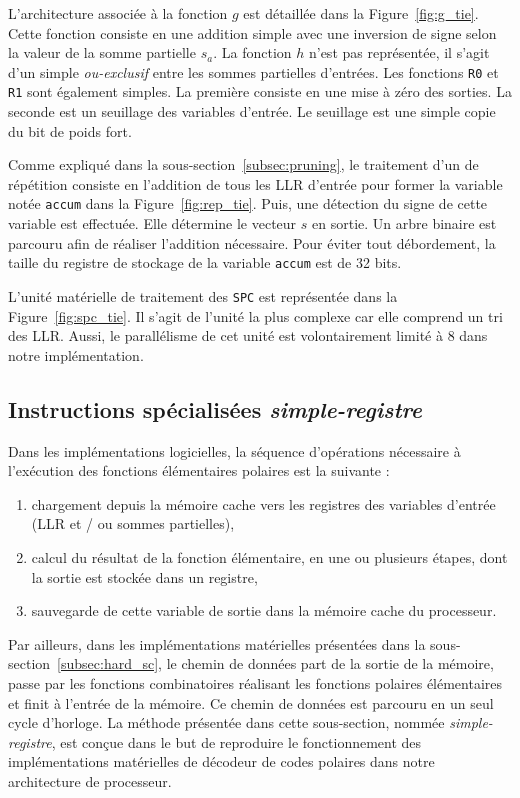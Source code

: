 L'architecture associée à la fonction $g$ est détaillée dans la Figure~\ref{fig:g_tie}. Cette fonction consiste en une addition simple avec une inversion de signe selon la valeur de la somme partielle $s_a$.
La fonction $h$ n'est pas représentée, il s'agit d'un simple \textit{ou-exclusif} entre les sommes partielles d'entrées. Les fonctions \texttt{R0} et \texttt{R1} sont également simples. La première consiste en une mise à zéro des sorties. La seconde est un seuillage des variables d'entrée. Le seuillage est une simple copie du bit de poids fort.

Comme expliqué dans la sous-section~\ref{subsec:pruning}, le traitement d'un \noeud de répétition consiste en l'addition de tous les LLR d'entrée pour former la variable notée \og \texttt{accum} \fg dans la Figure~\ref{fig:rep_tie}. Puis, une détection du signe de cette variable est effectuée. Elle détermine le vecteur $s$ en sortie. Un arbre binaire est parcouru afin de réaliser l'addition nécessaire. Pour éviter tout débordement, la taille du registre de stockage de la variable \texttt{accum} est de 32 bits.

L'unité matérielle de traitement des \noeuds \texttt{SPC} est représentée dans la Figure~\ref{fig:spc_tie}. Il s'agit de l'unité la plus complexe car elle comprend un tri des LLR. Aussi, le parallélisme de cet unité est volontairement limité à 8 dans notre implémentation.

\subsection{Instructions spécialisées \textit{simple-registre}}

Dans les implémentations logicielles, la séquence d'opérations nécessaire à l'exécution des fonctions élémentaires polaires est la suivante :
\begin{enumerate}[label=(\roman*)]
  \item chargement depuis la mémoire cache vers les registres des variables d'entrée (LLR et / ou sommes partielles),
  \item calcul du résultat de la fonction élémentaire, en une ou plusieurs étapes, dont la sortie est stockée dans un registre,
  \item sauvegarde de cette variable de sortie dans la mémoire cache du processeur.
\end{enumerate}

Par ailleurs, dans les implémentations matérielles présentées dans la sous-section~\ref{subsec:hard_sc}, le chemin de données part de la sortie de la mémoire, passe par les fonctions combinatoires réalisant les fonctions polaires élémentaires et finit à l'entrée de la mémoire. Ce chemin de données est parcouru en un seul cycle d'horloge. La méthode présentée dans cette sous-section, nommée \textit{simple-registre}, est conçue dans le but de reproduire le fonctionnement des implémentations matérielles de décodeur de codes polaires dans notre architecture de processeur.

